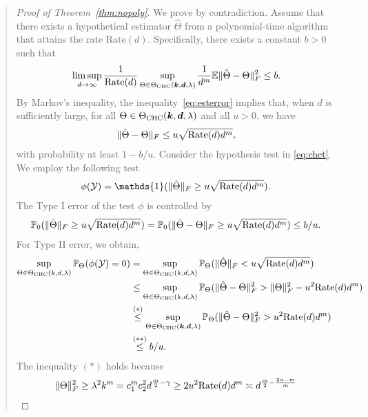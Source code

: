 \documentclass[11pt]{article}
\theoremstyle{plain}
\theoremstyle{definition}
\begin{document}
\begin{enumerate}[wide, labelwidth=!, labelindent=0pt]
\begin{quote}
\begin{proof}[Proof of Theorem~\ref{thm:nopoly}]
We prove by contradiction. Assume that there exists a hypothetical estimator $\hat\Theta$ from a polynomial-time algorithm  that attains the rate $\text{Rate}(d)$. Specifically, there exists a constant $b>0$ such that 
\begin{align}\label{eq:esterror}
   \limsup_{d\rightarrow\infty}\frac{1}{\textup{Rate}(d)} \sup_{\Theta\in\Theta_{\text{CHC}}(\bm{k},\bm{d},\lambda)}\frac{1}{d^m}\mathbb{E}\lVert\hat\Theta-\Theta\rVert_F^2\leq b.
\end{align}
By Markov's inequality, the inequality~\eqref{eq:esterror} implies that, when $d$ is sufficiently large, for all $\Theta\in\Theta_{\text{CHC}}(\bm{k},\bm{d},\lambda)$ and all $u>0$, we have
\begin{align}\label{eq:markov}
    \lVert\hat\Theta-\Theta\rVert_F\leq u \sqrt{\text{Rate}(d)d^{m}},
\end{align}
with probability at least $1-b/u$.
Consider the hypothesis test in \eqref{eq:chct}. We employ the following test 
\begin{align}
    \phi(\tY) = \mathds{1}(\FnormSize{}{\hat\Theta}\geq u\sqrt{\text{Rate}(d)d^m}).
\end{align}
The Type I error of the test $\phi$ is controlled by
\begin{align}
    \mathbb{P}_0(\lVert\hat\Theta\rVert_F\geq u\sqrt{\text{Rate}(d)d^m})  = \mathbb{P}_0(\lVert\hat\Theta-\Theta\rVert_F\geq u\sqrt{\text{Rate}(d)d^m}) \leq b/u.
\end{align}
For Type II error, we obtain,
\begin{align}
\sup_{\Theta\in\Theta_{\text{CHC}}(k,d,\lambda)}\mathbb{P}_\Theta(\phi(\mathcal{Y}) = 0) &= \sup_{\Theta\in\Theta_{\text{CHC}}(k,d,\lambda)}\mathbb{P}_\Theta(\lVert\hat\Theta\rVert_F< u \sqrt{\text{Rate}(d)d^m})\\&\leq\sup_{\Theta\in\Theta_{\text{CHC}}(k,d,\lambda)}\mathbb{P}_\Theta(\lVert\hat\Theta-\Theta\rVert_F^2> \lVert\Theta\rVert_F^2-u^2\text{Rate}(d)d^m)\\&\stackrel{(*)}{\leq}\sup_{\Theta\in\Theta_{\text{CHC}}(\bm{k},\bm{d},\lambda)}\mathbb{P}_\Theta(\lVert\hat\Theta-\Theta\rVert_F^2> u^2\text{Rate}(d)d^m)\\&\stackrel{(**)}{\leq} b/u.
\end{align}
The inequality $(*)$ holds because 
\begin{align}\label{eq:regime}
    \lVert\Theta\rVert_F^2\geq \lambda^2 k^m = c_1^mc_2^2d^{{m\over 2}-\gamma} \geq 2 u^2\text{Rate}(d)d^m \asymp d^{{m\over 2}-{2\alpha-m \over m}}
\end{align}

\end{proof}
\end{quote}
\end{enumerate}
\end{document}
